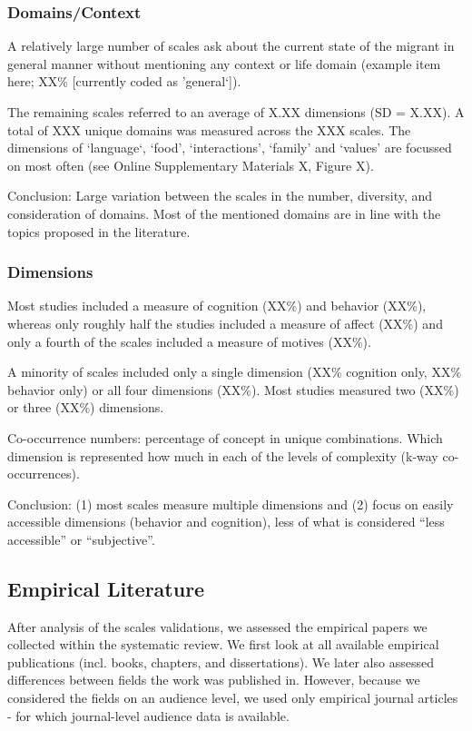 \documentclass[man, 12pt, a4paper]{apa7}
\begin{document}
\subsubsection{Domains/Context}
A relatively large number of scales ask about the current state of the migrant in general manner without mentioning any context or life domain (example item here; XX\% [currently coded as 'general‘]).

The remaining scales referred to an average of X.XX dimensions (SD = X.XX). A total of XXX unique domains was measured across the XXX scales. The dimensions of ‘language‘, ‘food’, ‘interactions’, ‘family’ and ‘values’ are focussed on most often (see Online Supplementary Materials X, Figure X).

Conclusion: Large variation between the scales in the number, diversity, and consideration of domains. Most of the mentioned domains are in line with the topics proposed in the literature.
\subsubsection{Dimensions}
Most studies included a measure of cognition (XX\%) and behavior (XX\%), whereas only roughly half the studies included a measure of affect (XX\%) and only a fourth of the scales included a measure of motives (XX\%).

A minority of scales included only a single dimension (XX\% cognition only, XX\% behavior only) or all four dimensions (XX\%). Most studies measured two (XX\%) or three (XX\%) dimensions.

Co-occurrence numbers: percentage of concept in unique combinations. Which dimension is represented how much in each of the levels of complexity (k-way co-occurrences).

Conclusion: (1) most scales measure multiple dimensions and (2) focus on easily accessible dimensions (behavior and cognition), less of what is considered ``less accessible'' or ``subjective''.

\subsection{Empirical Literature}
After analysis of the scales validations, we assessed the empirical papers we collected within the systematic review. We first look at all available empirical publications (incl. books, chapters, and dissertations). We later also assessed differences between fields the work was published in. However, because we considered the fields on an audience level, we used only empirical journal articles - for which journal-level audience data is available.
\end{document}
